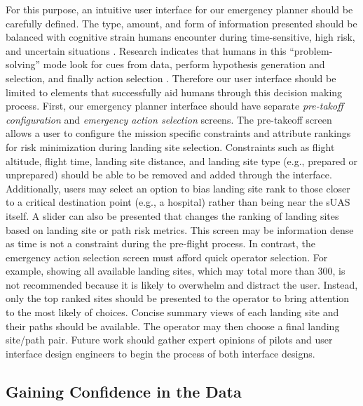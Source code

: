 For this purpose, an intuitive user interface for our emergency planner should be carefully defined. The type, amount, and form of information presented should be balanced with cognitive strain humans encounter during time-sensitive, high risk, and uncertain situations \cite{2003_technical_review_human_error}. Research indicates that humans in this ``problem-solving'' mode look for cues from data, perform hypothesis generation and selection, and finally action selection \cite{wickens_5_1988}. Therefore our user interface should be limited to elements that successfully aid humans through this decision making process. First, our emergency planner interface should have separate \emph{pre-takoff configuration} and \emph{emergency action selection} screens. The pre-takeoff screen allows a user to configure the mission specific constraints and attribute rankings for risk minimization during landing site selection. Constraints such as flight altitude, flight time, landing site distance, and landing site type (e.g., prepared or unprepared) should be able to be removed and added through the interface. Additionally, users may select an option to bias landing site rank to those closer to a critical destination point (e.g., a hospital) rather than being near the \ac{sUAS} itself. A slider can also be presented that changes the ranking of landing sites based on landing site or path risk metrics. This screen may be information dense as time is not a constraint during the pre-flight process. In contrast, the emergency action selection screen must afford quick operator selection. For example, showing all available landing sites, which may total more than 300, is not recommended because it is likely to overwhelm and distract the user. Instead, only the top ranked sites should be presented to the operator to bring attention to the most likely of choices. Concise summary views of each landing site and their paths should be available. The operator may then choose a final landing site/path pair. Future work should gather expert opinions of pilots and user interface design engineers to begin the process of both interface designs.

\subsection{Gaining Confidence in the Data}

